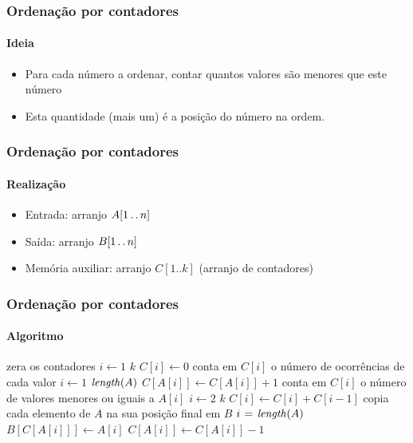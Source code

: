 \documentclass{beamer}
\begin{document}
\begin{frame}

  \frametitle{Ordenação por contadores}
  \framesubtitle{Ideia}
  \begin{itemize}

    \item Para cada número a ordenar, contar quantos valores são menores que este número

    \item Esta quantidade (mais um) é a posição do número na ordem.
      
  \end{itemize}
\end{frame}

\begin{frame}

  \frametitle{Ordenação por contadores}
  \framesubtitle{Realização}
  \begin{itemize}

    \item Entrada: arranjo $A [ 1 \mathinner{\ldotp\ldotp} n ]$

    \item Saída: arranjo $B [ 1 \mathinner{\ldotp\ldotp} n]$

    \item Memória auxiliar: arranjo $C[1..k]$ (arranjo de contadores)

  \end{itemize}
\end{frame}

\begin{frame}

\frametitle{Ordenação por contadores}
\framesubtitle{Algoritmo}
\begin{codebox}
\zi \Comment zera os contadores
\li \For $i \gets 1$ \To $k$
\li \Do $C[i] \gets 0$
    \End
\zi \Comment conta em $C[i]$ o número de ocorrências de cada valor
\li \For $i \gets 1$ \To $\id{length}(A)$
\li \Do $C[A[i]] \gets C[A[i]] + 1$
    \End
\zi \Comment conta em $C[i]$ o número de valores menores ou iguais a $A[i]$
\li \For $i \gets 2$ \To $k$
\li \Do $C[i] \gets C[i] + C[i-1]$
    \End
\zi \Comment copia cada elemento de $A$ na sua posição final em $B$
\li \For $i \gets \id{length}(A)$ 
\li \Do $B[C[A[i]]] \gets A[i]$
\li   $C[A[i]] \gets C[A[i]] - 1$
    \End
\end{codebox}

\end{frame}
\end{document}
